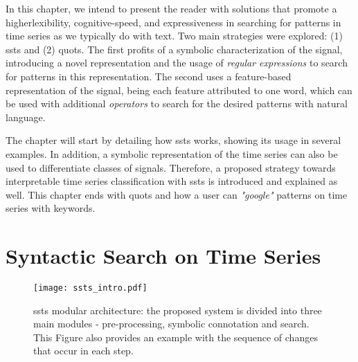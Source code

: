 \par
In this chapter, we intend to present the reader with solutions that promote a higherlexibility, cognitive-speed, and expressiveness in searching for patterns in time series as we typically do with text. Two main strategies were explored: (1) \gls{ssts} and (2) \gls{quots}. The first profits of a symbolic characterization of the signal, introducing a novel representation and the usage of \textit{regular expressions} to search for patterns in this representation. The second uses a feature-based representation of the signal, being each feature attributed to one word, which can be used with additional \textit{operators} to search for the desired patterns with natural language. 
\par
The chapter will start by detailing how \gls{ssts} works, showing its usage in several examples. In addition, a symbolic representation of the time series can also be used to differentiate classes of signals. Therefore, a proposed strategy towards interpretable time series classification with \gls{ssts} is introduced and explained as well. This chapter ends with \gls{quots} and how a user can \textit{"google"} patterns on time series with keywords.







\section{Syntactic Search on Time Series}

\begin{figure}
\centering
\texttt{[image: ssts\_intro.pdf]}
\caption{\gls{ssts} modular architecture: the proposed system is divided into three main modules - pre-processing, symbolic connotation and search. This Figure also provides an example with the sequence of changes that occur in each step.}
\label{fig:ssts_intro}
\end{figure}


